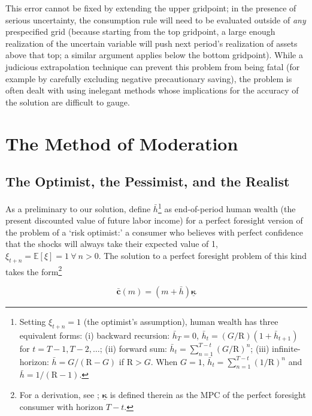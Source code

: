 \documentclass[twocolumn, switch]{article}
\newcommand{\Ex}{\mathbf{\mathbb{E}}}
\newcommand{\Rfree}{\text{R}}
\newcommand{\tranShk}{\xi}
\newcommand{\PermGroFac}{G}
\newcommand{\mNrm}{m}
\newcommand{\cFunc}{\mathbf{c}}
\newcommand{\cFuncOpt}{\bar{\cFunc}}
\newcommand{\hNrm}{h}
\newcommand{\hNrmOpt}{\bar{\hNrm}}
\newcommand{\MPC}{\boldsymbol{\kappa}}
\newcommand{\MPCmin}{\underline{\MPC}}
\begin{document}
This error cannot be fixed by extending the upper gridpoint; in the presence of
serious uncertainty, the consumption rule will need to be evaluated outside of
\textit{any} prespecified grid (because starting from the top gridpoint, a large enough
realization of the uncertain variable will push next period's realization of
assets above that top; a similar argument applies below the bottom gridpoint).
While a judicious extrapolation technique can prevent this problem from being
fatal (for example by carefully excluding negative precautionary saving), the
problem is often dealt with using inelegant methods whose implications for the
accuracy of the solution are difficult to gauge.

\section{The Method of Moderation}

\subsection{The Optimist, the Pessimist, and the Realist}

As a preliminary to our solution, define $\hNrmOpt$\footnote{Setting $\tranShk_{t+n}=1$ (the optimist's assumption), human wealth has three equivalent forms: (i) backward recursion: $\hNrmOpt_{T} = 0$, $\hNrmOpt_{t} = (\PermGroFac/\Rfree)(1 + \hNrmOpt_{t+1})$ for $t = T -1, T -2, \ldots$; (ii) forward sum: $\hNrmOpt_{t} = \sum_{n=1}^{T -t}(\PermGroFac/\Rfree)^{n}$; (iii) infinite-horizon: $\hNrmOpt = \PermGroFac/(\Rfree -\PermGroFac)$ if $\Rfree>\PermGroFac$. When $\PermGroFac=1$, $\hNrmOpt_{t} = \sum_{n=1}^{T -t}(1/\Rfree)^{n}$ and $\hNrmOpt = 1/(\Rfree -1)$.}
as end-of-period human wealth (the present discounted value of future labor
income) for a perfect foresight version of the problem of a `risk optimist:' a
consumer who believes with perfect confidence that the shocks will
always take their expected value of 1,
$\tranShk_{t+n} = \Ex[\tranShk]=1~\forall~n>0$. The solution to a perfect
foresight problem of this kind takes the form\footnote{For a derivation, see \citet{CarrollShanker2024}; $\MPCmin$ is defined therein as the MPC of the perfect foresight consumer with horizon $T -t$.}

\begin{equation}
\label{eq:cFuncOpt}
\cFuncOpt(\mNrm) = (\mNrm + \hNrmOpt)\MPCmin
\end{equation}
\end{document}
